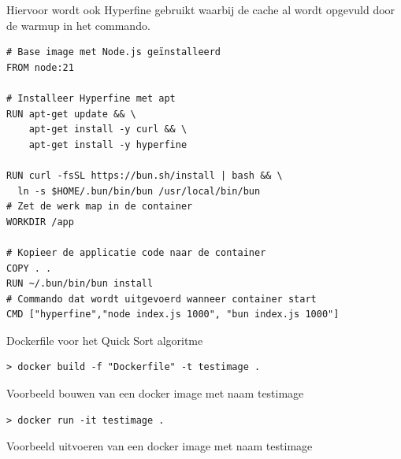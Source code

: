Hiervoor wordt ook Hyperfine gebruikt waarbij de cache al wordt opgevuld door de warmup in het commando.
\begin{listing}[H]
  \centering
  \begin{verbatim}
# Base image met Node.js geïnstalleerd
FROM node:21

# Installeer Hyperfine met apt
RUN apt-get update && \
    apt-get install -y curl && \
    apt-get install -y hyperfine

RUN curl -fsSL https://bun.sh/install | bash && \
  ln -s $HOME/.bun/bin/bun /usr/local/bin/bun
# Zet de werk map in de container
WORKDIR /app

# Kopieer de applicatie code naar de container
COPY . .
RUN ~/.bun/bin/bun install
# Commando dat wordt uitgevoerd wanneer container start
CMD ["hyperfine","node index.js 1000", "bun index.js 1000"]
      \end{verbatim}
      \caption{\label{code:dockerscript}Dockerfile voor het Quick Sort algoritme}
\end{listing}
\begin{listing}[H]
  \centering
  \begin{verbatim}
> docker build -f "Dockerfile" -t testimage .
      \end{verbatim}
      \caption{\label{code:dockerbuild}Voorbeeld bouwen van een docker image met naam testimage}
\end{listing}
\begin{listing}[H]
  \centering
  \begin{verbatim}
> docker run -it testimage .
      \end{verbatim}
      \caption{\label{code:dockerrun}Voorbeeld uitvoeren van een docker image met naam testimage}
\end{listing}

